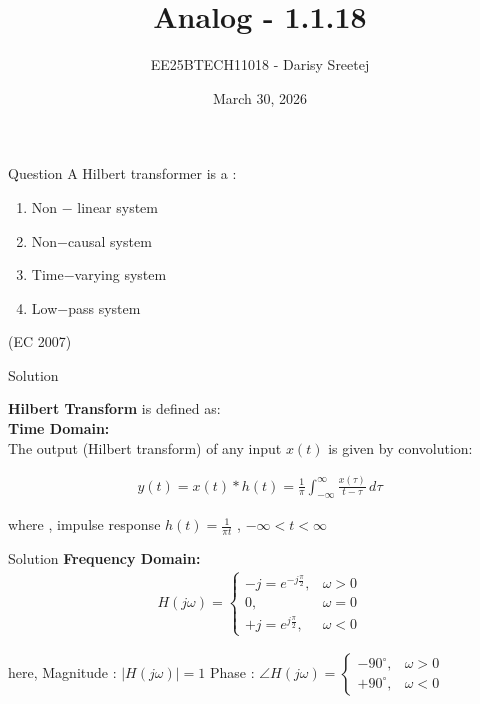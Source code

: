 \documentclass{beamer}
\title %
{Analog - 1.1.18}
\date{March 30, 2026}
\author %
{EE25BTECH11018 - Darisy Sreetej}
\begin{document}
\frame{\titlepage}

\begin{frame}{Question}
 A Hilbert transformer is a :
 \begin{enumerate}

\item  Non $-$ linear system
\item  Non$-$causal system
 \item Time$-$varying system
\item Low$-$pass system

 \end{enumerate}
 \hfill(EC 2007) 
\end{frame}
\begin{frame}{Solution}

\textbf{Hilbert Transform} is defined as:\\[6pt]

\textbf{Time Domain:}\\[4pt]
The output (Hilbert transform) of any input $x(t)$ is given by convolution:

\begin{align}
    y(t) = x(t) * h(t) = \frac{1}{\pi} \int_{-\infty}^{\infty} \frac{x(\tau)}{t - \tau} \, d\tau
\end{align}

where , impulse response $h(t) = \frac{1}{\pi t}$ , $-\infty < t < \infty$


\end{frame}
\begin{frame}{Solution}
\textbf{Frequency Domain:}\\[4pt]
\begin{align}
H(j\omega) =
\begin{cases}
-j = e^{-j\frac{\pi}{2}}, & \omega > 0 \\
0, & \omega = 0 \\
+j = e^{j\frac{\pi}{2}}, & \omega < 0
\end{cases}
\end{align}

here, 
Magnitude :
$
|H(j\omega)| = 1 
$
\quad
Phase :
$
\angle H(j\omega) =
\begin{cases}
-90^\circ, & \omega > 0 \\
+90^\circ, & \omega < 0
\end{cases}
$
\end{frame}
\end{document}

